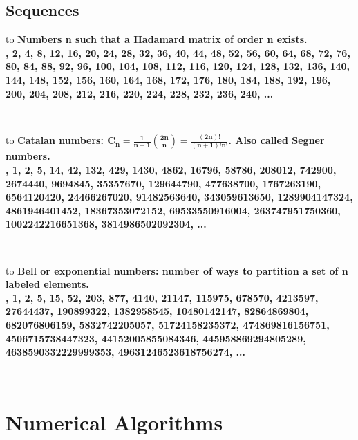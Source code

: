 \documentclass{book}
\begin{document}
\section{Sequences}
\noindent\begin{tabu*} to \textwidth {|X|}
\hline
\bfseries{Numbers n such that a Hadamard matrix of order n exists.}\\
, 2, 4, 8, 12, 16, 20, 24, 28, 32, 36, 40, 44, 48, 52, 56, 60, 64, 68, 72, 76, 80, 84, 88, 92, 96, 100, 104, 108, 112, 116, 120, 124, 128, 132, 136, 140, 144, 148, 152, 156, 160, 164, 168, 172, 176, 180, 184, 188, 192, 196, 200, 204, 208, 212, 216, 220, 224, 228, 232, 236, 240, ...\\
\hline
\end{tabu*}\\
\begin{tabu*} to \textwidth {|X|}
\hline
\bfseries{Catalan numbers: $\mathbf{C_n=\frac{1}{n+1}{{2n}\choose{n}}=\frac{(2n)!}{(n+1)!n!}}$. Also called Segner numbers.}\\
, 1, 2, 5, 14, 42, 132, 429, 1430, 4862, 16796, 58786, 208012, 742900, 2674440, 9694845, 35357670, 129644790, 477638700, 1767263190, 6564120420, 24466267020, 91482563640, 343059613650, 1289904147324, 4861946401452, 18367353072152, 69533550916004, 263747951750360, 1002242216651368, 3814986502092304, ...\\
\hline
\end{tabu*}\\
\begin{tabu*} to \textwidth {|X|}
\hline
\bfseries{Bell or exponential numbers: number of ways to partition a set of n labeled elements.}\\
, 1, 2, 5, 15, 52, 203, 877, 4140, 21147, 115975, 678570, 4213597, 27644437, 190899322, 1382958545, 10480142147, 82864869804, 682076806159, 5832742205057, 51724158235372, 474869816156751, 4506715738447323, 44152005855084346, 445958869294805289, 4638590332229999353, 49631246523618756274, ...\\
\hline
\end{tabu*}\\\chapter{Numerical Algorithms}
\newpage
{}
\end{document}
